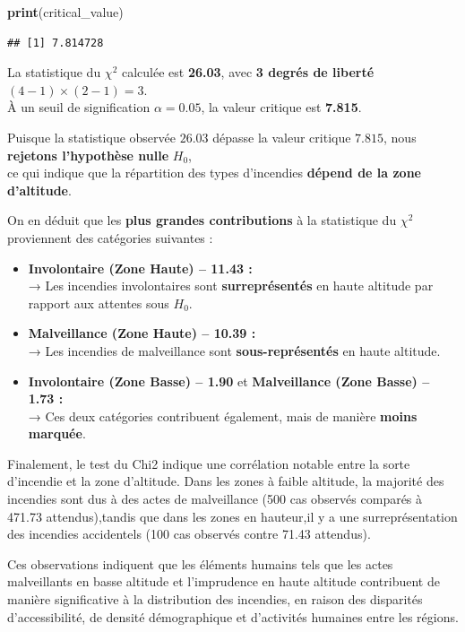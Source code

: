\documentclass[
]{article}
\newenvironment{Shaded}{\begin{snugshade}}{\end{snugshade}}
\newcommand{\FunctionTok}[1]{\textcolor[rgb]{0.13,0.29,0.53}{\textbf{#1}}}
\newcommand{\NormalTok}[1]{#1}
\begin{document}
\begin{Shaded}
\begin{Highlighting}[]
\FunctionTok{print}\NormalTok{(critical\_value)}
\end{Highlighting}
\end{Shaded}

\begin{verbatim}
## [1] 7.814728
\end{verbatim}

La statistique du \(\chi^2\) calculée est \textbf{26.03}, avec \textbf{3
degrés de liberté} \((4-1) \times (2-1) = 3\).\\
À un seuil de signification \(\alpha = 0.05\), la valeur critique est
\textbf{7.815}.

Puisque la statistique observée \(26.03\) dépasse la valeur critique
\(7.815\), nous \textbf{rejetons l'hypothèse nulle} \(H_0\),\\
ce qui indique que la répartition des types d'incendies \textbf{dépend
de la zone d'altitude}.

On en déduit que les \textbf{plus grandes contributions} à la
statistique du \(\chi^2\) proviennent des catégories suivantes :

\begin{itemize}
\item
  \textbf{Involontaire (Zone Haute) -- 11.43 :}\\
  → Les incendies involontaires sont \textbf{surreprésentés} en haute
  altitude par rapport aux attentes sous \(H_0\).
\item
  \textbf{Malveillance (Zone Haute) -- 10.39 :}\\
  → Les incendies de malveillance sont \textbf{sous-représentés} en
  haute altitude.
\item
  \textbf{Involontaire (Zone Basse) -- 1.90} et \textbf{Malveillance
  (Zone Basse) -- 1.73 :}\\
  → Ces deux catégories contribuent également, mais de manière
  \textbf{moins marquée}.
\end{itemize}

Finalement, le test du Chi2 indique une corrélation notable entre la
sorte d'incendie et la zone d'altitude. Dans les zones à faible
altitude, la majorité des incendies sont dus à des actes de malveillance
(500 cas observés comparés à 471.73 attendus),tandis que dans les zones
en hauteur,il y a une surreprésentation des incendies accidentels (100
cas observés contre 71.43 attendus).

Ces observations indiquent que les éléments humains tels que les actes
malveillants en basse altitude et l'imprudence en haute altitude
contribuent de manière significative à la distribution des incendies, en
raison des disparités d'accessibilité, de densité démographique et
d'activités humaines entre les régions.
\end{document}
